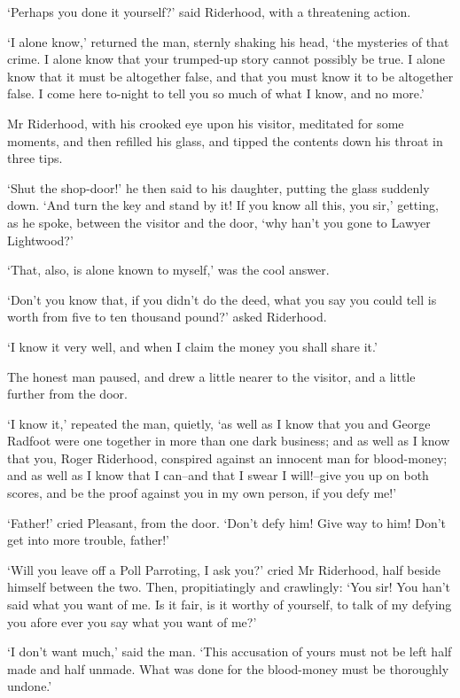 ‘Perhaps you done it yourself?’ said Riderhood, with a threatening
action.

‘I alone know,’ returned the man, sternly shaking his head, ‘the
mysteries of that crime. I alone know that your trumped-up story cannot
possibly be true. I alone know that it must be altogether false, and
that you must know it to be altogether false. I come here to-night to
tell you so much of what I know, and no more.’

Mr Riderhood, with his crooked eye upon his visitor, meditated for some
moments, and then refilled his glass, and tipped the contents down his
throat in three tips.

‘Shut the shop-door!’ he then said to his daughter, putting the glass
suddenly down. ‘And turn the key and stand by it! If you know all this,
you sir,’ getting, as he spoke, between the visitor and the door, ‘why
han’t you gone to Lawyer Lightwood?’

‘That, also, is alone known to myself,’ was the cool answer.

‘Don’t you know that, if you didn’t do the deed, what you say you could
tell is worth from five to ten thousand pound?’ asked Riderhood.

‘I know it very well, and when I claim the money you shall share it.’

The honest man paused, and drew a little nearer to the visitor, and a
little further from the door.

‘I know it,’ repeated the man, quietly, ‘as well as I know that you and
George Radfoot were one together in more than one dark business; and as
well as I know that you, Roger Riderhood, conspired against an innocent
man for blood-money; and as well as I know that I can--and that I swear
I will!--give you up on both scores, and be the proof against you in my
own person, if you defy me!’

‘Father!’ cried Pleasant, from the door. ‘Don’t defy him! Give way to
him! Don’t get into more trouble, father!’

‘Will you leave off a Poll Parroting, I ask you?’ cried Mr Riderhood,
half beside himself between the two. Then, propitiatingly and
crawlingly: ‘You sir! You han’t said what you want of me. Is it fair, is
it worthy of yourself, to talk of my defying you afore ever you say what
you want of me?’

‘I don’t want much,’ said the man. ‘This accusation of yours must not be
left half made and half unmade. What was done for the blood-money must
be thoroughly undone.’


